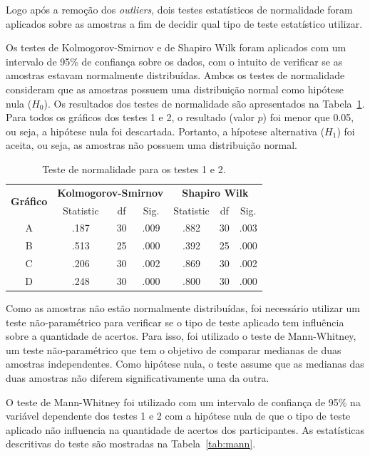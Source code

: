 \documentclass[
	12pt,				%
	openright,			%
	oneside,			%
	a4paper,			%
	english,			%
	brazil				%
	]{abntex2}
\begin{document}
Logo após a remoção dos \textit{outliers}, dois testes estatísticos de normalidade foram aplicados sobre as amostras a fim de decidir qual tipo de teste estatístico utilizar.

Os testes de Kolmogorov-Smirnov e de Shapiro Wilk foram aplicados com um intervalo de 95\% de confiança sobre os dados, com o intuito de verificar se as amostras estavam normalmente distribuídas. Ambos os testes de normalidade consideram que as amostras possuem uma distribuição normal como hipótese nula ($H_0$). Os resultados dos testes de normalidade são apresentados na Tabela~\ref{tab:normalidade}. Para todos os gráficos dos testes 1 e 2, o resultado (valor $p$) foi menor que 0.05, ou seja, a hipótese nula foi descartada. Portanto, a hípotese alternativa ($H_1$) foi aceita, ou seja, as amostras não possuem uma distribuição normal.

\begin{table}[!h]
\centering
\def\arraystretch{1.25}
\caption{Teste de normalidade para os testes 1 e 2.}
\label{tab:normalidade}
\begin{tabular}{|c|c|c|c|c|c|c|}

\hline
\multirow{ 2}{*}{\textbf{Gráfico}} & \multicolumn{3}{|c|}{\textbf{Kolmogorov-Smirnov}} &\multicolumn{3}{|c|}{\textbf{Shapiro Wilk}}\\\cline{2-7}
& Statistic & df & Sig. & Statistic & df & Sig.\\
\hline
 A & .187 & 30 & .009 & .882 & 30 & .003 \\
 B & .513 & 25 & .000 & .392 & 25 & .000 \\
 C & .206 & 30 & .002 & .869 & 30 & .002 \\
 D & .248 & 30 & .000 & .800 & 30 & .000 \\
\hline

\end{tabular}
\end{table}

Como as amostras não estão normalmente distribuídas, foi necessário utilizar um teste não-paramétrico para verificar se o tipo de teste aplicado tem influência sobre a quantidade de acertos. Para isso, foi utilizado o teste de Mann-Whitney, um teste não-paramétrico que tem o objetivo de comparar medianas de duas amostras independentes. Como hipótese nula, o teste assume que as medianas das duas amostras não diferem significativamente uma da outra.

O teste de Mann-Whitney foi utilizado com um intervalo de confiança de 95\% na variável dependente dos testes 1 e 2 com a hipótese nula de que o tipo de teste aplicado não influencia na quantidade de acertos dos participantes. As estatísticas descritivas do teste são mostradas na Tabela~\ref{tab:mann}.
\end{document}
